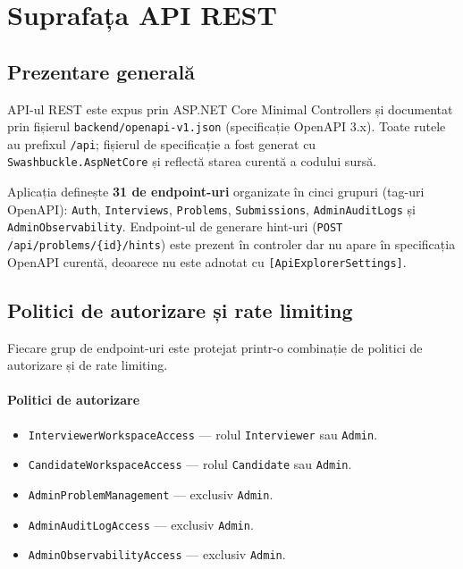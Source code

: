 
\section{Suprafața API REST}
\label{sec:api_surface}

\subsection{Prezentare generală}

API-ul REST este expus prin ASP.NET Core Minimal Controllers și documentat
prin fișierul \texttt{backend/openapi-v1.json} (specificație OpenAPI 3.x).
Toate rutele au prefixul \texttt{/api}; fișierul de specificație a fost
generat cu \texttt{Swashbuckle.AspNetCore} și reflectă starea curentă a
codului sursă.

Aplicația definește \textbf{31 de endpoint-uri} organizate în cinci grupuri
(tag-uri OpenAPI): \texttt{Auth}, \texttt{Interviews}, \texttt{Problems},
\texttt{Submissions}, \texttt{AdminAuditLogs} și \texttt{AdminObservability}.
Endpoint-ul de generare hint-uri (\texttt{POST /api/problems/\{id\}/hints})
este prezent în controler dar nu apare în specificația OpenAPI curentă,
deoarece nu este adnotat cu \texttt{[ApiExplorerSettings]}.

\subsection{Politici de autorizare și rate limiting}

Fiecare grup de endpoint-uri este protejat printr-o combinație de politici
de autorizare și de rate limiting.

\paragraph{Politici de autorizare}
\begin{itemize}
  \item \texttt{InterviewerWorkspaceAccess} — rolul \texttt{Interviewer} sau \texttt{Admin}.
  \item \texttt{CandidateWorkspaceAccess} — rolul \texttt{Candidate} sau \texttt{Admin}.
  \item \texttt{AdminProblemManagement} — exclusiv \texttt{Admin}.
  \item \texttt{AdminAuditLogAccess} — exclusiv \texttt{Admin}.
  \item \texttt{AdminObservabilityAccess} — exclusiv \texttt{Admin}.
\end{itemize}

